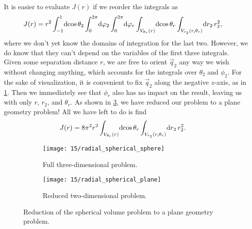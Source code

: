 It is easier to evaluate $J(r)$ if we reorder the integrals as
\begin{align}
	J(r)
	&= r^2 \int_{-1}^1\! \dif \cos{\theta_2} \int_0^{2 \pi}\! \dif \phi_2 \int_0^{2 \pi}\! \dif \phi_r \int_{V_{\theta_r}(r)}\! \dif \cos{\theta_r} \int_{V_{r_2}(r, \theta_r)}\! \dif r_2 \, r_2^2,
\end{align}
where we don't yet know the domains of integration for the last two.
However, we do know that they can't depend on the variables of the first three integrals.
Given some separation distance $r$, we are free to orient $\vec{q}_2$ any way we wish without changing anything, which accounts for the integrals over $\theta_2$ and $\phi_2$.
For the sake of visualization, it is convenient to fix $\vec{q}_2$ along the negative $z$-axis, as in \cref{fig:radial-spherical-sphere}.
Then we immediately see that $\phi_r$ also has no impact on the result, leaving us with only $r$, $r_2$, and $\theta_r$.
As shown in \cref{fig:radial-spherical-plane}, we have reduced our problem to a plane geometry problem!
All we have left to do is find
\begin{align}
	J(r)
	&= 8 \pi^2 r^2 \int_{V_{\theta_r}(r)}\! \dif \cos{\theta_r}
		\int_{V_{r_2}(r, \theta_r)}\! \dif r_2 \, r_2^2.
\end{align}

\begin{figure}
	\centering
	\begin{subfigure}[b]{0.45\textwidth}
		\centering
		\texttt{[image: 15/radial\_spherical\_sphere]}
		\caption{
			Full three-dimensional problem.
		}
		\label{fig:radial-spherical-sphere}
	\end{subfigure}
	\hfill
	\begin{subfigure}[b]{0.45\textwidth}
		\centering
		\texttt{[image: 15/radial\_spherical\_plane]}
		\vspace{5.2 mm}
		\caption{
			Reduced two-dimensional problem.
		}
		\label{fig:radial-spherical-plane}
	\end{subfigure}
	\caption[
		Reduction of spherical volume problem
	]{
		Reduction of the spherical volume problem to a plane geometry problem.
	}
\end{figure}

